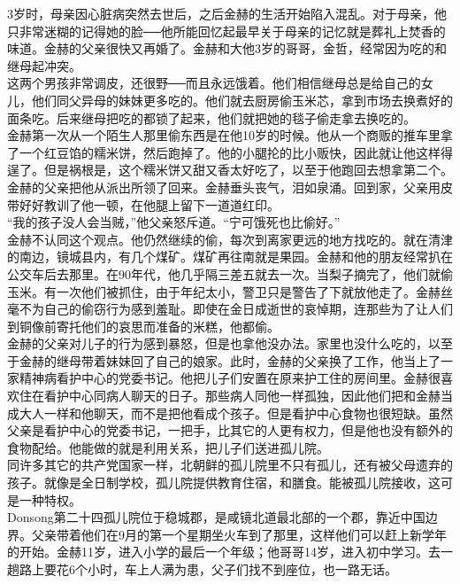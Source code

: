 3岁时，母亲因心脏病突然去世后，之后金赫的生活开始陷入混乱。对于母亲，他只非常迷糊的记得她的脸──他所能回忆起最早关于母亲的记忆就是葬礼上焚香的味道。金赫的父亲很快又再婚了。金赫和大他3岁的哥哥，金哲，经常因为吃的和继母起冲突。\\

这两个男孩非常调皮，还很野──而且永远饿着。他们相信继母总是给自己的女儿，他们同父异母的妹妹更多吃的。他们就去厨房偷玉米芯，拿到市场去换煮好的面条吃。后来继母把吃的都锁了起来，他们就把她的毯子偷走拿去换吃的。\\

金赫第一次从一个陌生人那里偷东西是在他10岁的时候。他从一个商贩的推车里拿了一个红豆馅的糯米饼，然后跑掉了。他的小腿抡的比小贩快，因此就让他这样得逞了。但是祸根是，这个糯米饼又甜又香太好吃了，以至于他跑回去想拿第二个。\\

金赫的父亲把他从派出所领了回来。金赫垂头丧气，泪如泉涌。回到家，父亲用皮带好好教训了他一顿，在他腿上留下一道道红印。\\

“我的孩子没人会当贼，”他父亲怒斥道。“宁可饿死也比偷好。”\\

金赫不认同这个观点。他仍然继续的偷，每次到离家更远的地方找吃的。就在清津的南边，镜城县内，有几个煤矿。煤矿再往南就是果园。金赫和他的朋友经常扒在公交车后去那里。在90年代，他几乎隔三差五就去一次。当梨子摘完了，他们就偷玉米。有一次他们被抓住，由于年纪太小，警卫只是警告了下就放他走了。金赫丝毫不为自己的偷窃行为感到羞耻。即使在金日成逝世的哀悼期，连那些为了让人们到铜像前寄托他们的哀思而准备的米糕，他都偷。\\

金赫的父亲对儿子的行为感到暴怒，但是也拿他没办法。家里也没什么吃的，以至于金赫的继母带着妹妹回了自己的娘家。此时，金赫的父亲换了工作，他当上了一家精神病看护中心的党委书记。他把儿子们安置在原来护工住的房间里。金赫很喜欢住在看护中心同病人聊天的日子。那些病人同他一样孤独，因此他们把和金赫当成大人一样和他聊天，而不是把他看成个孩子。但是看护中心食物也很短缺。虽然父亲是看护中心的党委书记，一把手，比其它的人更有权力，但是他也没有额外的食物配给。他能做的就是利用关系，把儿子们送进孤儿院。\\

同许多其它的共产党国家一样，北朝鲜的孤儿院里不只有孤儿，还有被父母遗弃的孩子。就像是全日制学校，孤儿院提供教育住宿，和膳食。能被孤儿院接收，这可是一种特权。\\

Donsong第二十四孤儿院位于稳城郡，是咸镜北道最北部的一个郡，靠近中国边界。父亲带着他们在9月的第一个星期坐火车到了那里，这样他们可以赶上新学年的开始。金赫11岁，进入小学的最后一个年级；他哥哥14岁，进入初中学习。去一趟路上要花6个小时，车上人满为患，父子们找不到座位，也一路无话。\\

